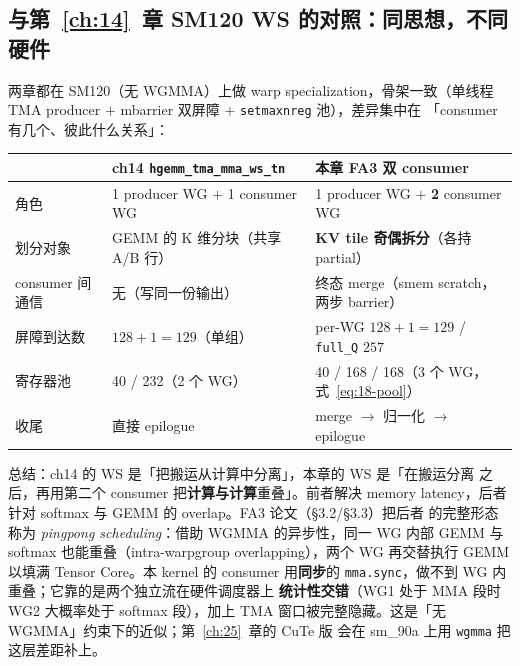 \subsection{与第~\ref{ch:14}~章 SM120 WS 的对照：同思想，不同硬件}

两章都在 SM120（无 WGMMA）上做 warp specialization，骨架一致（单线程 TMA
producer $+$ mbarrier 双屏障 $+$ \texttt{setmaxnreg} 池），差异集中在
「consumer 有几个、彼此什么关系」：

\begin{center}
\begin{tabular}{lll}
\toprule
 & ch14 \texttt{hgemm\_\allowbreak{}tma\_\allowbreak{}mma\_\allowbreak{}ws\_\allowbreak{}tn} & 本章 FA3 双 consumer \\
\midrule
角色 & 1 producer WG $+$ 1 consumer WG & 1 producer WG $+$ \textbf{2} consumer WG \\
划分对象 & GEMM 的 K 维分块（共享 A/B 行） & \textbf{KV tile 奇偶拆分}（各持 partial） \\
consumer 间通信 & 无（写同一份输出） & 终态 merge（smem scratch，两步 barrier）\\
屏障到达数 & $128 + 1 = 129$（单组） & per-WG $128{+}1{=}129$ / \texttt{full\_Q} $257$ \\
寄存器池 & 40 / 232（2 个 WG） & 40 / 168 / 168（3 个 WG，式~\ref{eq:18-pool}）\\
收尾 & 直接 epilogue & merge $\to$ 归一化 $\to$ epilogue \\
\bottomrule
\end{tabular}
\end{center}

总结：ch14 的 WS 是「把搬运从计算中分离」，本章的 WS 是「在搬运分离
之后，再用第二个 consumer 把\textbf{计算与计算}重叠」。前者解决 memory
latency，后者针对 softmax 与 GEMM 的 overlap。FA3 论文（§3.2/§3.3）把后者
的完整形态称为 \emph{pingpong scheduling}：借助 WGMMA 的异步性，同一 WG 内部
GEMM 与 softmax 也能重叠（intra-warpgroup overlapping），两个 WG 再交替执行
GEMM 以填满 Tensor Core。本 kernel 的 consumer 用\textbf{同步}的
\texttt{mma.sync}，做不到 WG 内重叠；它靠的是两个独立流在硬件调度器上
\textbf{统计性交错}（WG1 处于 MMA 段时 WG2 大概率处于 softmax 段），加上 TMA
窗口被完整隐藏。这是「无 WGMMA」约束下的近似；第~\ref{ch:25}~章的 CuTe 版
会在 sm\_90a 上用 \texttt{wgmma} 把这层差距补上。

